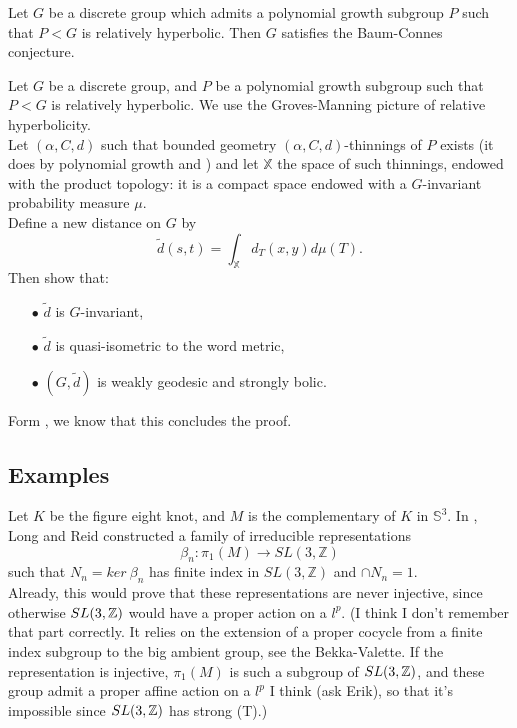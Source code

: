 \begin{prop} Let $G$ be a discrete group which admits a polynomial growth subgroup $P$ such that $P<G$ is relatively hyperbolic. Then $G$ satisfies the Baum-Connes conjecture.
\end{prop}

Let $G$ be a discrete group, and $P$ be a polynomial growth subgroup such that $P<G$ is relatively hyperbolic. We use the Groves-Manning picture of relative hyperbolicity. \\

Let $(\alpha, C,d)$ such that bounded geometry $(\alpha, C ,d )$-thinnings of $P$ exists (it does by polynomial growth and \cite{guentnerproper}) and let $\mathbb X$ the space of such thinnings, endowed with the product topology: it is a compact space endowed with a $G$-invariant probability measure $\mu$.\\

Define a new distance on $G$ by
\[\tilde d (s,t) = \int_{\mathbb X} d_T(x,y) d\mu (T).\]
Then show that:
\begin{itemize}
\item[$\bullet$] $\tilde d$ is $G$-invariant,
\item[$\bullet$] $\tilde d$ is quasi-isometric to the word metric,
\item[$\bullet$] $(G,\tilde d)$ is weakly geodesic and strongly bolic.
\end{itemize}
Form \cite{mineyev2002baum}, we know that this concludes the proof.

\subsection{Examples}

Let $K$ be the figure eight knot, and $M$ is the complementary of $K$ in $\mathbb S^3$. In \cite{long2011small}, Long and Reid constructed a family of irreducible representations 
\[\beta_n : \pi_1 (M) \rightarrow SL(3,\mathbb Z)\]
such that $N_n = ker \ \beta_n $ has finite index in $SL(3,\mathbb Z)$ and $\cap N_n = 1$.\\

Already, this would prove that these representations are never injective, since otherwise $SL(3,\mathbb Z)$ would have a proper action on a $l^p$. (I think I don't remember that part correctly. It relies on the extension of a proper cocycle from a finite index subgroup to the big ambient group, see the Bekka-Valette. If the representation is injective, $\pi_1(M)$ is such a subgroup of $SL(3,\mathbb Z)$, and these group admit a proper affine action on a $l^p$ I think (ask Erik), so that it's impossible since $SL(3,\mathbb Z)$ has strong (T).)

